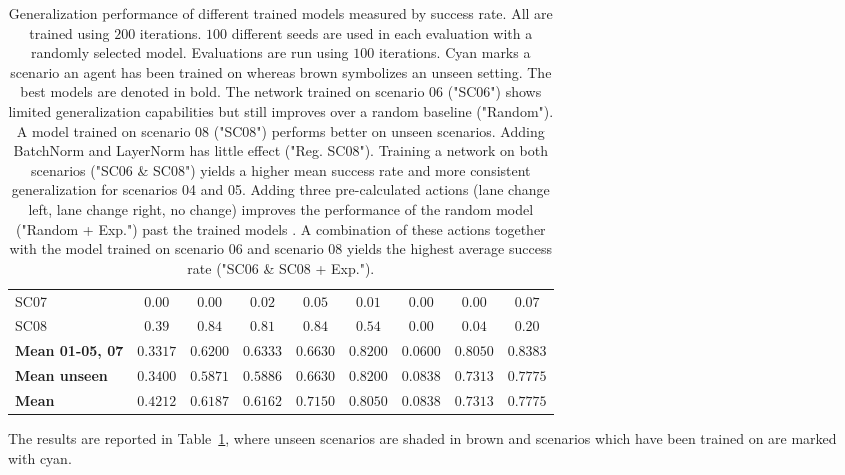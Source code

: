 \begin{landscape}
\begin{table}[h]
{\begin{tabular}{lcccccccc}
    SC07 & \cellcolor{lightbrown}$0.00$ & \cellcolor{lightbrown}$0.00$ & \cellcolor{lightbrown}$0.02$ & \cellcolor{lightbrown}$0.05$ & \cellcolor{lightbrown}$0.01$ & \cellcolor{lightbrown}$0.00$ & \cellcolor{lightbrown}$0.00$ & \cellcolor{lightbrown}$\mathbf{0.07}$ \\
    SC08 & \cellcolor{lightbrown}$0.39$ & \cellcolor{lightkit}$\mathbf{0.84}$ & \cellcolor{lightkit}$0.81$ & \cellcolor{lightkit}$\mathbf{0.84}$ &  \cellcolor{lightkit}$0.54$ & \cellcolor{lightbrown}$0.00$ & \cellcolor{lightbrown}$0.04$ & \cellcolor{lightbrown}$0.20$ \\
    \midrule
    \textbf{Mean 01-05, 07} & $0.3317$ & $0.6200$ & $0.6333$ & $0.6630$ &  $0.8200$ & $0.0600$ & $0.8050$ & $\mathbf{0.8383}$ \\
    \textbf{Mean unseen} & $0.3400$ & $0.5871$ & $0.5886$ & $0.6630$ & $\mathbf{0.8200}$ & $0.0838$ & $0.7313$ & $0.7775$ \\
    \textbf{Mean} & $0.4212$ & $0.6187$ & $0.6162$ & $0.7150$ & $\mathbf{0.8050}$ & $0.0838$ & $0.7313$ & $0.7775$ \\
    \bottomrule
  \end{tabular}
  }
\caption[Generalization performance]{Generalization performance of different trained models measured by success rate. All are trained using $200$ iterations. $100$ different seeds are used in each evaluation with a randomly selected model. Evaluations are run using $100$ iterations.  Cyan marks a scenario an agent has been trained on whereas brown symbolizes an unseen setting. The best models are denoted in bold. The network trained on scenario 06 ("SC06") shows limited generalization capabilities but still improves over a random baseline ("Random"). A model trained on scenario 08 ("SC08") performs better on unseen scenarios. Adding BatchNorm and LayerNorm has little effect ("Reg. SC08"). Training a network on both scenarios ("SC06 \& SC08") yields a higher mean success rate and more consistent generalization for scenarios 04 and 05. Adding three pre-calculated actions (lane change left, lane change right, no change) improves the performance of the random model ("Random + Exp.") past the trained models
. A combination of these actions together with the model trained on scenario 06 and scenario 08 yields the highest average success rate ("SC06 \& SC08 + Exp.").}
\label{tab:generalization_performance}
\end{table}
\end{landscape}
The results are reported in Table~\ref{tab:generalization_performance}, where unseen scenarios are shaded in brown and scenarios which have been trained on are marked with cyan.

